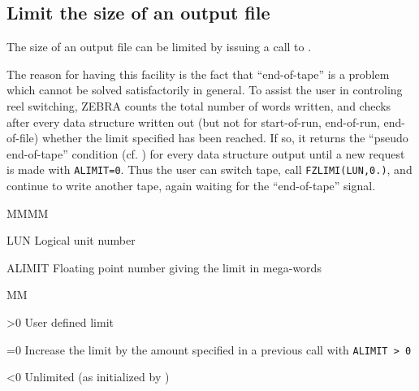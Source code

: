 \subsection{Limit the size of an output file}
The size of an output file can be limited by issuing a call to .
\par
The reason for having this facility is the fact that ``end-of-tape''
is a problem which cannot be solved satisfactorily in general.
To assist the user in controling reel switching,
ZEBRA counts the total number of words written,
and checks after every data structure written out
(but not for start-of-run, end-of-run, end-of-file)
whether the limit specified has been reached.
If so, it returns the ``pseudo end-of-tape'' condition (cf. )
for every data structure output until a new request is made
with {\tt ALIMIT=0}. Thus the user can switch tape, call
{\tt FZLIMI(LUN,0.)},
and continue to write another tape,
again waiting for the ``end-of-tape'' signal.
\Idesc
\begin{DL}{MMMM}
\item[LUN]Logical unit number
\item[ALIMIT]Floating point number giving the limit in mega-words
\begin{DL}{MM}
\item[>0]User defined limit
\item[=0]Increase the limit by the amount specified in a previous call
with {\tt ALIMIT > 0}
\item[<0]Unlimited (as initialized by )
\end{DL}
\end{DL}
